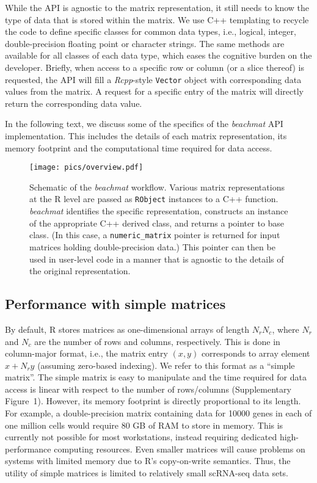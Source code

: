 \documentclass[10pt,letterpaper]{article}
\newcommand{\beachmat}{\textit{beachmat}}
\newcommand{\code}[1]{\texttt{#1}}
\newcommand{\suppfigsimpleaccess}{1}
\begin{document}
While the API is agnostic to the matrix representation, it still needs to know the type of data that is stored within the matrix.
We use C++ templating to recycle the code to define specific classes for common data types, i.e., logical, integer, double-precision floating point or character strings.
The same methods are available for all classes of each data type, which eases the cognitive burden on the developer.
Briefly, when access to a specific row or column (or a slice thereof) is requested, the API will fill a \textit{Rcpp}-style \code{Vector} object with corresponding data values from the matrix.
A request for a specific entry of the matrix will directly return the corresponding data value.

In the following text, we discuss some of the specifics of the \beachmat{} API implementation.
This includes the details of each matrix representation, its memory footprint and the computational time required for data access.

\begin{figure}[btp]
    \begin{center}
        \texttt{[image: pics/overview.pdf]}
    \end{center}
    \caption{Schematic of the \beachmat{} workflow.
        Various matrix representations at the R level are passed as \code{RObject} instances to a C++ function.
        \beachmat{} identifies the specific representation, constructs an instance of the appropriate C++ derived class, and returns a pointer to base class.
        (In this case, a \code{numeric\_matrix} pointer is returned for input matrices holding double-precision data.)
        This pointer can then be used in user-level code in a manner that is agnostic to the details of the original representation.
    }
    \label{fig:beachoverview}
\end{figure}

\subsection*{Performance with simple matrices}
By default, R stores matrices as one-dimensional arrays of length $N_rN_c$, where $N_r$ and $N_c$ are the number of rows and columns, respectively.
This is done in column-major format, i.e., the matrix entry $(x, y)$ corresponds to array element $x + N_ry$ (assuming zero-based indexing).
We refer to this format as a ``simple matrix''.
The simple matrix is easy to manipulate and the time required for data access is linear with respect to the number of rows/columns (Supplementary Figure~\suppfigsimpleaccess{}).
However, its memory footprint is directly proportional to its length.
For example, a double-precision matrix containing data for 10000 genes in each of one million cells would require 80 GB of RAM to store in memory.
This is currently not possible for most workstations, instead requiring dedicated high-performance computing resources.
Even smaller matrices will cause problems on systems with limited memory due to R's copy-on-write semantics.
Thus, the utility of simple matrices is limited to relatively small scRNA-seq data sets.
\end{document}
